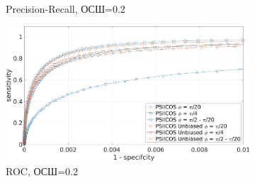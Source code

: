 \documentclass[12pt]{beamer}
\begin{document}
\begin{frame}[t]
\begin{figure}[htbp]
\begin{subfigure}[t]{0.49\textwidth}
            {\tiny Precision-Recall, ОСШ=0.2}
        \end{subfigure}
        \begin{subfigure}[t]{0.49\textwidth}
            \centering
            \includegraphics[width=0.9\linewidth]{../images/roc_snr_02.jpg}
            {\tiny ROC, ОСШ=0.2}
        \end{subfigure}
    \end{figure}
\end{frame}
\end{document}
